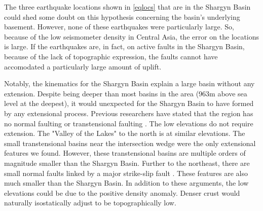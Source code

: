 	The three earthquake locations shown in \ref{eqlocs} that are in the Shargyn Basin could shed some doubt on this hypothesis concerning the basin's underlying basement. However, none of these earthquakes were particularly large. So, because of the low seismometer density in Central Asia, the error on the locations is large. If the earthquakes are, in fact, on active faults in the Shargyn Basin, because of the lack of topographic expression, the faults cannot have accomodated a particularly large amount of uplift.

	Notably, the kinematics for the Shargyn Basin explain a large basin without any extension. Despite being deeper than most basins in the area (963m above sea level at the deepest), it would unexpected for the Shargyn Basin to have formed by any extensional process. Previous researchers have stated that the region has no normal faulting or transtensional faulting \citep{Cunningham2005a}. The low elevations do not require extension. The "Valley of the Lakes" to the north is at similar elevations. The small transtensional basins near the intersection wedge were the only extensional features we found. However, these transtensional basins are multiple orders of magnitude smaller than the Shargyn Basin. Further to the northeast, there are small normal faults linked by a major strike-slip fault \citep{Walker2006}. These features are also much smaller than the Shargyn Basin. In addition to these arguments, the low elevations could be due to the positive density anomaly. Denser crust would naturally isostatically adjust to be topographically low. 


